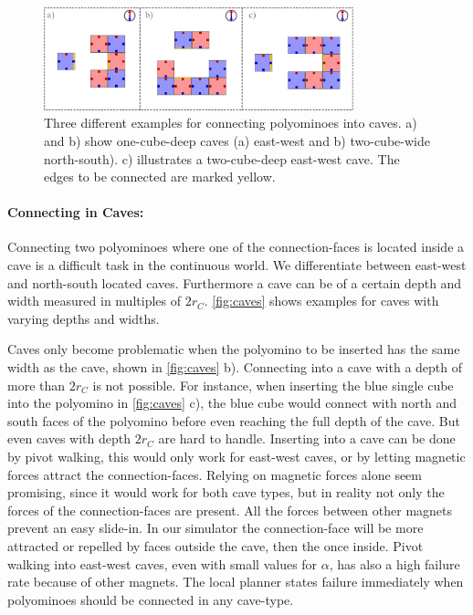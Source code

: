 \begin{figure}
	\centering
	\includegraphics[width=0.80\textwidth]{figures/caves.pdf}
	\caption[Examples for connecting polyominoes into caves]{Three different examples for connecting polyominoes into caves. a) and b) show one-cube-deep caves (a) east-west and b) two-cube-wide north-south). c) illustrates a two-cube-deep east-west cave. The edges to be connected are marked yellow.}
	\label{fig:caves}
\end{figure}


\paragraph{Connecting in Caves:}

Connecting two polyominoes where one of the connection-faces is located inside a cave is a difficult task in the continuous world.
We differentiate between east-west and north-south located caves.
Furthermore a cave can be of a certain depth and width measured in multiples of $2 r_C$.
\autoref{fig:caves} shows examples for caves with varying depths and widths.

Caves only become problematic when the polyomino to be inserted has the same width as the cave, shown in \autoref{fig:caves} b).
Connecting into a cave with a depth of more than $2 r_C$ is not possible.
For instance, when inserting the blue single cube into the polyomino in \autoref{fig:caves} c), the blue cube would connect with north and south faces of the polyomino before even reaching the full depth of the cave.
But even caves with depth $2 r_C$ are hard to handle.
Inserting into a cave can be done by pivot walking, this would only work for east-west caves, or by letting magnetic forces attract the connection-faces.
Relying on magnetic forces alone seem promising, since it would work for both cave types, but in reality not only the forces of the connection-faces are present.
All the forces between other magnets prevent an easy slide-in.
In our simulator the connection-face will be more attracted or repelled by faces outside the cave, then the once inside.
Pivot walking into east-west caves, even with small values for $\alpha$, has also a high failure rate because of other magnets.
The local planner states failure immediately when polyominoes should be connected in any cave-type.

